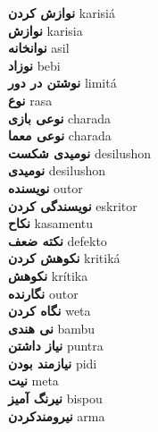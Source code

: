 \textbf{ نوازش کردن  } karisiá \\
\textbf{ نوازش  } karisia \\
\textbf{ نوانخانه  } asil \\
\textbf{ نوزاد  } bebi \\
\textbf{ نوشتن در دور  } limitá \\
\textbf{ نوع  } rasa \\
\textbf{ نوعی بازی  } charada \\
\textbf{ نوعی معما  } charada \\
\textbf{ نومیدی شکست  } desilushon \\
\textbf{ نومیدی  } desilushon \\
\textbf{ نویسنده  } outor \\
\textbf{ نویسندگی کردن  } eskritor \\
\textbf{ نکاح  } kasamentu \\
\textbf{ نکته ضعف  } defekto \\
\textbf{ نکوهش کردن  } kritiká \\
\textbf{ نکوهش  } krítika \\
\textbf{ نگارنده  } outor \\
\textbf{ نگاه کردن  } weta \\
\textbf{ نی هندی  } bambu \\
\textbf{ نیاز داشتن  } puntra \\
\textbf{ نیازمند بودن  } pidi \\
\textbf{ نیت  } meta \\
\textbf{ نیرنگ آمیز  } bispou \\
\textbf{ نیرومندکردن  } arma \\
